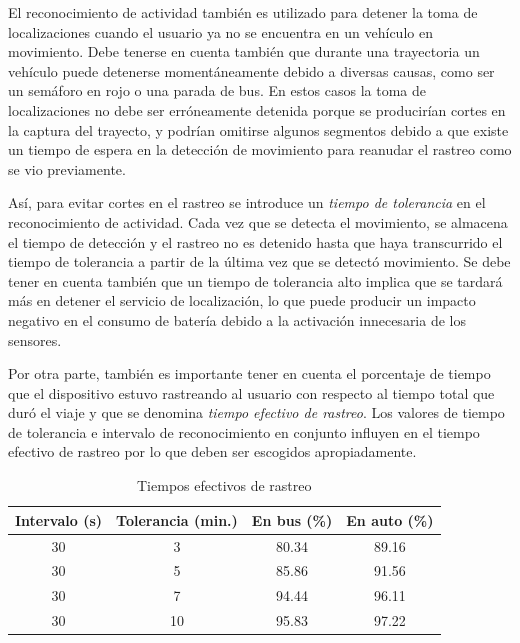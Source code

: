 El reconocimiento de actividad también es utilizado para detener la toma de localizaciones cuando el usuario ya no se encuentra en un vehículo en movimiento. Debe tenerse en cuenta también que durante una trayectoria un vehículo puede detenerse momentáneamente debido a diversas causas, como ser un semáforo en rojo o una parada de bus. En estos casos la toma de localizaciones no debe ser erróneamente detenida porque se producirían cortes en la captura del trayecto, y podrían omitirse algunos segmentos debido a que existe un tiempo de espera en la detección de movimiento para reanudar el rastreo como se vio previamente.

Así, para evitar cortes en el rastreo se introduce un \emph{tiempo de tolerancia} en el reconocimiento de actividad. Cada vez que se detecta el movimiento, se almacena el tiempo de detección y el rastreo no es detenido hasta que haya transcurrido el tiempo de tolerancia a partir de la última vez que se detectó movimiento. Se debe tener en cuenta también que un tiempo de tolerancia alto implica que se tardará más en detener el servicio de localización, lo que puede producir un impacto negativo en el consumo de batería debido a la activación innecesaria de los sensores.

Por otra parte, también es importante tener en cuenta el porcentaje de tiempo que el dispositivo estuvo rastreando al usuario con respecto al tiempo total que duró el viaje y que se denomina \emph{tiempo efectivo de rastreo}. Los valores de tiempo de tolerancia e intervalo de reconocimiento en conjunto influyen en el tiempo efectivo de rastreo por lo que deben ser escogidos apropiadamente.

\begin{table}[h]
	\centering
	\begin{tabular}{cccc}
		\toprule
		Intervalo (s) & Tolerancia (min.) & En bus (\%) & En auto (\%) \\
		\midrule
		30            & 3                 & 80.34         & 89.16 \\
		30            & 5                 & 85.86         & 91.56 \\
		30            & 7                & 94.44         & 96.11  \\
		30            & 10                & 95.83         & 97.22 \\
		\bottomrule
	\end{tabular}
	\caption{Tiempos efectivos de rastreo}
	\label{tab:prom_tiempo_efectivo_rastreo}
\end{table}


